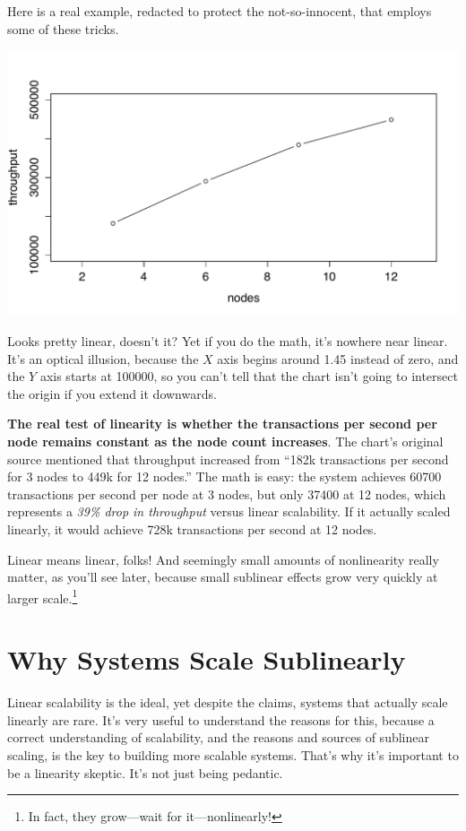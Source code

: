 \documentclass{vivid_layout}
\begin{document}
Here is a real example, redacted to protect the not-so-innocent, that employs
some of these tricks.
\begin{center}
\includegraphics[width=.85\linewidth]{scalability/voltdb1}
\end{center}
Looks pretty linear, doesn't it? Yet if you do the math, it's nowhere near
linear.  It's an optical illusion, because the $X$ axis begins around
1.45 instead of zero, and the $Y$ axis starts at 100000, so you can't tell that
the chart isn't going to intersect the origin if you extend it downwards.

{\bfseries The real test of linearity is whether the transactions per second per
node remains constant as the node count increases}. The chart's original source
mentioned that throughput increased from ``182k transactions per second for 3
nodes to 449k for 12 nodes.'' The math is easy: the system achieves 60700
transactions per second per node at 3 nodes, but only 37400 at 12 nodes, which
represents a {\itshape 39\% drop in throughput} versus linear scalability.  If
it actually scaled linearly, it would achieve 728k transactions per second at 12
nodes.

Linear means linear, folks! And seemingly small amounts of nonlinearity really
matter, as you'll see later, because small sublinear effects grow very quickly
at larger scale.\footnote{In fact, they grow---wait for it---nonlinearly!}

\section{Why Systems Scale Sublinearly}

Linear scalability is the ideal, yet despite the claims, systems that actually
scale linearly are rare.  It's very useful to understand the reasons for this,
because a correct understanding of scalability, and the reasons and sources of
sublinear scaling, is the key to building more scalable systems.  That's why
it's important to be a linearity skeptic.  It's not just being pedantic.
\end{document}

